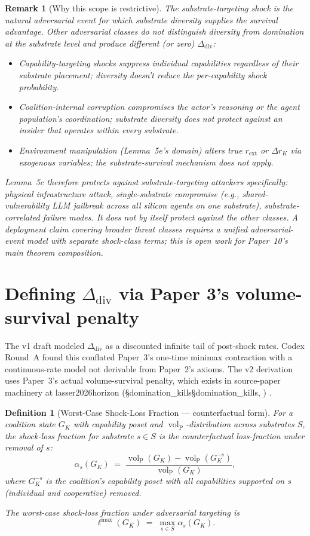\documentclass{article}
\makeatletter
\newcommand{\citep}[2][]{%
  \begingroup
  \def\@tmpkey{#2}%
  \ifx\@tmpkey\@empty\else
    (\ifx\@empty#1\@empty\else #1, \fi
     \@nameuse{bibkey@\@tmpkey})%
  \fi
  \endgroup
}
\newtheorem{definition}{Definition}
\newtheorem{remark}{Remark}
\DeclareMathOperator{\vol}{vol}
\newcommand{\volL}{{\vol_{\mathrm{P}}}}
\newcommand{\rext}{r_{\mathrm{ext}}}
\newcommand{\Ddiv}{\Delta_{\mathrm{div}}}
\makeatother
\begin{document}
\begin{remark}[Why this scope is restrictive]
The substrate-targeting shock is the natural adversarial event for
which substrate diversity supplies the survival advantage. Other
adversarial classes do not distinguish diversity from domination at
the substrate level and produce different (or zero) $\Ddiv$:
\begin{itemize}
\item \emph{Capability-targeting shocks} suppress individual
  capabilities regardless of their substrate placement; diversity
  doesn't reduce the per-capability shock probability.
\item \emph{Coalition-internal corruption} compromises the actor's
  reasoning or the agent population's coordination; substrate
  diversity does not protect against an insider that operates within
  every substrate.
\item \emph{Environment manipulation} (Lemma~5e's domain) alters true
  $\rext$ or $\Delta r_K$ via exogenous variables; the
  substrate-survival mechanism does not apply.
\end{itemize}

Lemma~5c therefore protects against substrate-targeting attackers
specifically: physical infrastructure attack, single-substrate
compromise (e.g., shared-vulnerability LLM jailbreak across all
silicon agents on one substrate), substrate-correlated failure
modes.  It does not by itself protect against the other classes.
A deployment claim covering broader threat classes requires a
unified adversarial-event model with separate shock-class terms; this
is open work for Paper~10's main theorem composition.
\end{remark}

\section{Defining $\Ddiv$ via Paper 3's volume-survival penalty}

The v1 draft modeled $\Ddiv$ as a discounted infinite tail of
post-shock rates.  Codex Round~A found this conflated Paper~3's
one-time minimax contraction with a continuous-rate model not
derivable from Paper~2's axioms.  The v2 derivation uses Paper~3's
actual volume-survival penalty, which exists in source-paper machinery
at \citep[\S domination\_kills]{lasser2026horizon}.

\begin{definition}[Worst-Case Shock-Loss Fraction --- counterfactual form]
\label{def:loss_fraction}
For a coalition state $G_K$ with capability poset and
$\volL$-distribution across substrates $S$, the \emph{shock-loss
fraction} for substrate $s \in S$ is the counterfactual loss-fraction
under removal of $s$:
\[
  \alpha_s(G_K) \;=\; \frac{\volL(G_K) - \volL(G_K^{-s})}{\volL(G_K)},
\]
where $G_K^{-s}$ is the coalition's capability poset with all
capabilities supported on $s$ (individual and cooperative) removed.

The \emph{worst-case shock-loss fraction} under adversarial targeting
is
\[
  \ell^{\max}(G_K) \;=\; \max_{s \in S} \alpha_s(G_K).
\]
\end{definition}
\end{document}
